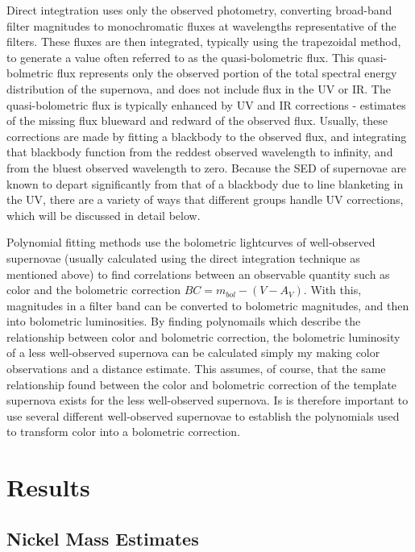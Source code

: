 \documentclass[apj]{emulateapj}
\begin{document}
Direct integtration uses only the observed photometry, converting broad-band filter magnitudes to monochromatic fluxes at wavelengths representative of the filters.
These fluxes are then integrated, typically using the trapezoidal method, to generate a value often referred to as the quasi-bolometric flux.
This quasi-bolmetric flux represents only the observed portion of the total spectral energy distribution of the supernova, and does not include flux in the UV or IR.
The quasi-bolometric flux is typically enhanced by UV and IR corrections - estimates of the missing flux blueward and redward of the observed flux. %
Usually, these corrections are made by fitting a blackbody to the observed flux, and integrating that blackbody function from the reddest observed wavelength to infinity, and from the bluest observed wavelength to zero. %
Because the SED of supernovae are known to depart significantly from that of a blackbody due to line blanketing in the UV, there are a variety of ways that different groups handle UV corrections, which will be discussed in detail below. %

Polynomial fitting methods use the bolometric lightcurves of well-observed supernovae (usually calculated using the direct integration technique as mentioned above) to find correlations between an observable quantity such as color and the bolometric correction $BC = m_{bol} - (V - A_V)$.
With this, magnitudes in a filter band can be converted to bolometric magnitudes, and then into bolometric luminosities.
By finding polynomails which describe the relationship between color and bolometric correction, the bolometric luminosity of a less well-observed supernova can be calculated simply my making color observations and a distance estimate.
This assumes, of course, that the same relationship found between the color and bolometric correction of the template supernova exists for the less well-observed supernova.
Is is therefore important to use several different well-observed supernovae to establish the polynomials used to transform color into a bolometric correction.

\section{Results}

\subsection{Nickel Mass Estimates}
\end{document}
